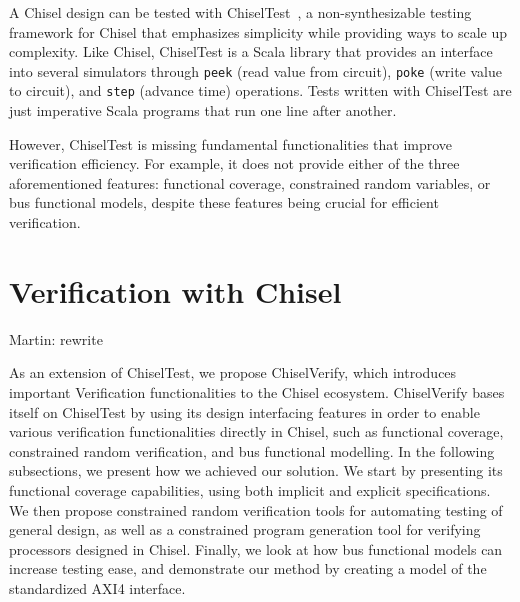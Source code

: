 \documentclass[conference]{IEEEtran}
\newcommand{\martin}[1]{{\color{blue} Martin: #1}}
\begin{document}
A Chisel design can be tested with ChiselTest~\cite{chisel:tester2}, a non-synthesizable 
testing framework for Chisel that emphasizes simplicity while providing ways to scale up 
complexity. Like Chisel, ChiselTest is a Scala library that provides an interface into several 
simulators through \texttt{peek} (read value from circuit), \texttt{poke} (write value to 
circuit), and \texttt{step} (advance time) operations. Tests written with ChiselTest are just 
imperative Scala programs that run one line after another.


However, ChiselTest is missing fundamental functionalities that improve verification efficiency. 
For example, it does not provide either of the three aforementioned features: functional 
coverage, constrained random variables, or bus functional models, despite these features being 
crucial for efficient verification.

\section{Verification with Chisel}
\label{sec:verify}

\martin{rewrite}

As an extension of ChiselTest, we propose ChiselVerify, which introduces important Verification functionalities to the Chisel ecosystem.
ChiselVerify bases itself on ChiselTest by using its design interfacing features in order to enable various verification functionalities directly in Chisel, such as functional coverage, constrained random verification, and bus functional modelling. 
In the following subsections, we present how we achieved our solution.
We start by presenting its functional coverage capabilities,  using both implicit and explicit specifications.
We then propose constrained random verification tools for automating testing of general design, as well as a constrained program generation tool for verifying processors designed in Chisel.
Finally, we look at how bus functional models can increase testing ease, and demonstrate our method by creating a model of the standardized AXI4 interface. 
\end{document}
